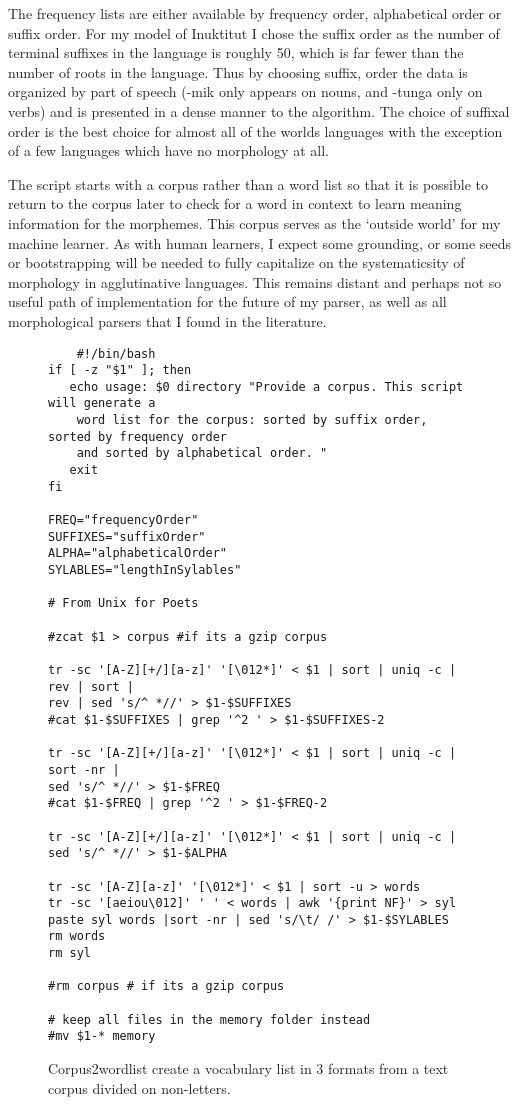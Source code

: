 \documentclass[runningheads,a4paper]{llncs}
\begin{document}
The frequency lists are either available by frequency order, alphabetical order or suffix order. For my model of Inuktitut I chose the suffix order as the number of terminal suffixes in the language is roughly 50, which is far fewer than the number of roots in the language. Thus by choosing suffix, order the data is organized by part of speech (-mik only appears on nouns, and -tunga only on verbs) and is presented in a dense manner to the algorithm. The choice of suffixal order is the best choice for almost all of the worlds languages with the exception of a few languages which have no morphology at all.

 The script starts with a corpus rather than a word list so that it is possible to return to the corpus later to check for a word in context to learn meaning information for the morphemes. This corpus serves as the `outside world' for my machine learner. As with human learners, I expect some grounding, or some seeds or bootstrapping will be needed to fully capitalize on the systematicsity of morphology in agglutinative languages. This remains distant and perhaps not so useful path of implementation for the future of my parser, as well as all morphological parsers that I found in the literature.


\begin{figure*}
\begin{verbatim}
	#!/bin/bash
if [ -z "$1" ]; then 
   echo usage: $0 directory "Provide a corpus. This script will generate a 
    word list for the corpus: sorted by suffix order, sorted by frequency order 
    and sorted by alphabetical order. "
   exit
fi

FREQ="frequencyOrder"
SUFFIXES="suffixOrder"
ALPHA="alphabeticalOrder"
SYLABLES="lengthInSylables"

# From Unix for Poets

#zcat $1 > corpus #if its a gzip corpus

tr -sc '[A-Z][+/][a-z]' '[\012*]' < $1 | sort | uniq -c | rev | sort |
rev | sed 's/^ *//' > $1-$SUFFIXES
#cat $1-$SUFFIXES | grep '^2 ' > $1-$SUFFIXES-2

tr -sc '[A-Z][+/][a-z]' '[\012*]' < $1 | sort | uniq -c | sort -nr | 
sed 's/^ *//' > $1-$FREQ
#cat $1-$FREQ | grep '^2 ' > $1-$FREQ-2

tr -sc '[A-Z][+/][a-z]' '[\012*]' < $1 | sort | uniq -c | 
sed 's/^ *//' > $1-$ALPHA

tr -sc '[A-Z][a-z]' '[\012*]' < $1 | sort -u > words
tr -sc '[aeiou\012]' ' ' < words | awk '{print NF}' > syl
paste syl words |sort -nr | sed 's/\t/ /' > $1-$SYLABLES
rm words
rm syl 

#rm corpus # if its a gzip corpus

# keep all files in the memory folder instead
#mv $1-* memory
\end{verbatim}
	\caption{Corpus2wordlist create a vocabulary list in 3 formats from a text corpus divided on non-letters.}
	\label{fig:corpus2wordlist}
\end{figure*}
\end{document}
